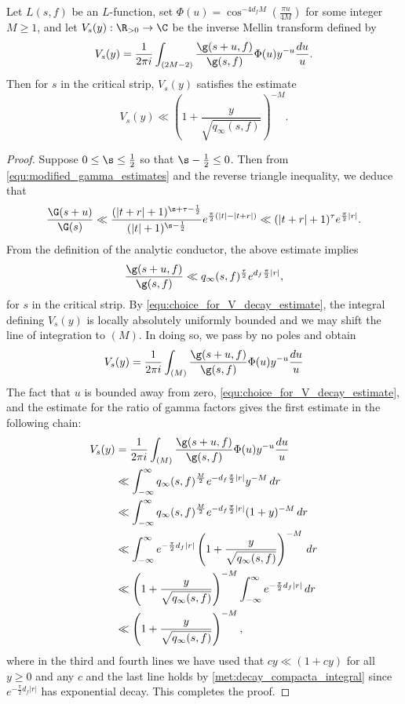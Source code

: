     \begin{proposition}\label{prop:V_function_decay}
      Let $L(s,f)$ be an $L$-function, set $\Phi(u) = \cos^{-4d_{f}M}\left(\frac{\pi u}{4M}\right)$ for some integer $M \ge 1$, and let $V_{s}(y):\R_{> 0} \to \C$ be the inverse Mellin transform defined by
      \[
        V_{s}(y) = \frac{1}{2\pi i}\int_{(2M-2)}\frac{\g(s+u,f)}{\g(s,f)}\Phi(u)y^{-u}\frac{du}{u}.
      \]
      Then for $s$ in the critical strip, $V_{s}(y)$ satisfies the estimate
      \[
        V_{s}(y) \ll \left(1+\frac{y}{\sqrt{q_{\infty}(s,f)}}\right)^{-M}.
      \]
    \end{proposition}
    \begin{proof}
      Suppose $0 \le \s \le \frac{1}{2}$ so that $\s-\frac{1}{2} \le 0$. Then from \cref{equ:modified_gamma_estimates} and the reverse triangle inequality, we deduce that
      \[
        \frac{\G(s+u)}{\G(s)} \ll \frac{(|t+r|+1)^{\s+\tau-\frac{1}{2}}}{(|t|+1)^{\s-\frac{1}{2}}}e^{\frac{\pi}{2}(|t|-|t+r|)} \ll (|t+r|+1)^{\tau}e^{\frac{\pi}{2}|r|}.
      \]
      From the definition of the analytic conductor, the above estimate implies
      \[
        \frac{\g(s+u,f)}{\g(s,f)} \ll q_{\infty}(s,f)^{\frac{\tau}{2}}e^{d_{f}\frac{\pi}{2}|r|},
      \]
      for $s$ in the critical strip. By \cref{equ:choice_for_V_decay_estimate}, the integral defining $V_{s}(y)$ is locally absolutely uniformly bounded and we may shift the line of integration to $(M)$. In doing so, we pass by no poles and obtain
      \[
        V_{s}(y) = \frac{1}{2\pi i}\int_{(M)}\frac{\g(s+u,f)}{\g(s,f)}\Phi(u)y^{-u}\frac{du}{u} \\
      \]
      The fact that $u$ is bounded away from zero, \cref{equ:choice_for_V_decay_estimate}, and the estimate for the ratio of gamma factors gives the first estimate in the following chain:
      \begin{align*}
        V_{s}(y) &= \frac{1}{2\pi i}\int_{(M)}\frac{\g(s+u,f)}{\g(s,f)}\Phi(u)y^{-u}\frac{du}{u} \\
        &\ll \int_{-\infty}^{\infty}q_{\infty}(s,f)^{\frac{M}{2}}e^{-d_{f}\frac{\pi}{2}|r|}y^{-M}\,dr \\
        &\ll \int_{-\infty}^{\infty}q_{\infty}(s,f)^{\frac{M}{2}}e^{-d_{f}\frac{\pi}{2}|r|}(1+y)^{-M}\,dr \\
        &\ll \int_{-\infty}^{\infty}e^{-\frac{\pi}{2}d_{f}|r|}\left(1+\frac{y}{\sqrt{q_{\infty}(s,f)}}\right)^{-M}\,dr \\
        &\ll \left(1+\frac{y}{\sqrt{q_{\infty}(s,f)}}\right)^{-M}\int_{-\infty}^{\infty}e^{-\frac{\pi}{2}d_{f}|r|}\,dr \\
        &\ll \left(1+\frac{y}{\sqrt{q_{\infty}(s,f)}}\right)^{-M},
      \end{align*}
      where in the third and fourth lines we have used that $cy \ll (1+cy)$ for all $y \ge 0$ and any $c$ and the last line holds by \cref{met:decay_compacta_integral} since $e^{-\frac{\pi}{2}d_{f}|r|}$ has exponential decay. This completes the proof.
    \end{proof}

